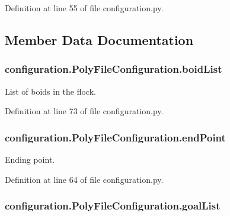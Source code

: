 Definition at line 55 of file configuration.\-py.



\subsection{Member Data Documentation}
\hypertarget{classconfiguration_1_1PolyFileConfiguration_a34104bbe3eb34147465a4d9e05d6c6b6}{
\subsubsection[{boid\-List}]{\setlength{\rightskip}{0pt plus 5cm}configuration.\-Poly\-File\-Configuration.\-boid\-List}}\label{classconfiguration_1_1PolyFileConfiguration_a34104bbe3eb34147465a4d9e05d6c6b6}


List of boids in the flock. 



Definition at line 73 of file configuration.\-py.

\hypertarget{classconfiguration_1_1PolyFileConfiguration_acb9da93ddecef1bb34bbce601473f0f1}{
\subsubsection[{end\-Point}]{\setlength{\rightskip}{0pt plus 5cm}configuration.\-Poly\-File\-Configuration.\-end\-Point}}\label{classconfiguration_1_1PolyFileConfiguration_acb9da93ddecef1bb34bbce601473f0f1}


Ending point. 



Definition at line 64 of file configuration.\-py.

\hypertarget{classconfiguration_1_1PolyFileConfiguration_a2fd4dfe65bb97105e3ff146d125849df}{
\subsubsection[{goal\-List}]{\setlength{\rightskip}{0pt plus 5cm}configuration.\-Poly\-File\-Configuration.\-goal\-List}}\label{classconfiguration_1_1PolyFileConfiguration_a2fd4dfe65bb97105e3ff146d125849df}


